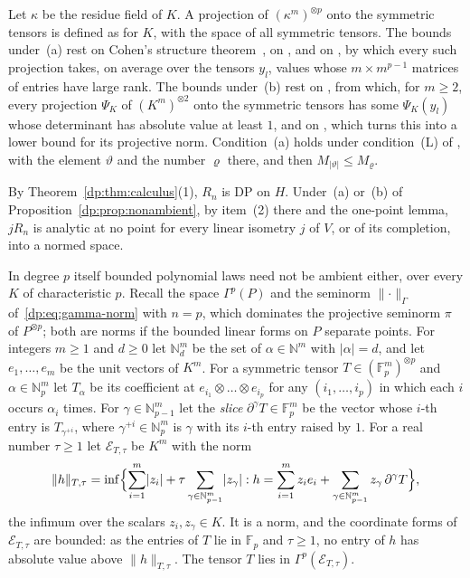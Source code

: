 \documentclass[11pt]{amsart}
\theoremstyle{definition}
\theoremstyle{remark}
\numberwithin{equation}{section}
\newcommand{\N}{\mathbb N}
\newcommand{\F}{\mathbb F}
\newcommand{\abs}[1]{\lvert #1\rvert}
\newcommand{\norm}[1]{\lVert #1\rVert}
\theoremstyle{plain}
\theoremstyle{definition}
\theoremstyle{plain}
\begin{document}
Let $\kappa$ be the residue field of $K$. A projection of $(\kappa^m)^{\otimes p}$ onto the symmetric tensors is defined as for $K$, with the space of all symmetric tensors. The bounds under~(a) rest on Cohen's structure theorem~\cite{Co}, on \cite[Lemma~K.2(2)]{I}, and on \cite[Lemma~Q.6(4)]{I}, by which every such projection takes, on average over the tensors $y_l$, values whose $m\times m^{p-1}$ matrices of entries have large rank. The bounds under~(b) rest on \cite[Proposition~N.12]{I}, from which, for $m\ge2$, every projection $\Psi_K$ of $(K^m)^{\otimes2}$ onto the symmetric tensors has some $\Psi_K(y_l)$ whose determinant has absolute value at least $1$, and on \cite[Lemma~N.15(2)]{I}, which turns this into a lower bound for its projective norm. Condition~(a) holds under condition~\textup{(L)} of \cite[Section~7.1]{I}, with the element $\vartheta$ and the number $\varrho$ there, and then $M_{\abs\vartheta}\le M_\varrho$.

By Theorem~\ref{dp:thm:calculus}(1), $R_n$ is DP on $H$. Under~(a) or~(b) of Proposition~\ref{dp:prop:nonambient}, by item~(2) there and the one-point lemma, $jR_n$ is analytic at no point for every linear isometry $j$ of $V$, or of its completion, into a normed space.

In degree $p$ itself bounded polynomial laws need not be ambient either, over every $K$ of characteristic $p$. Recall the space $\Gamma^p(P)$ and the seminorm $\norm\cdot_\Gamma$ of~\eqref{dp:eq:gamma-norm} with $n=p$, which dominates the projective seminorm $\pi$ of $P^{\otimes p}$; both are norms if the bounded linear forms on $P$ separate points. For integers $m\ge1$ and $d\ge0$ let $\N^m_d$ be the set of $\alpha\in\N^m$ with $\abs\alpha=d$, and let $e_1,\dots,e_m$ be the unit vectors of $K^m$. For a symmetric tensor $T\in(\F_p^m)^{\otimes p}$ and $\alpha\in\N^m_p$ let $T_\alpha$ be its coefficient at $e_{i_1}\otimes\dots\otimes e_{i_p}$ for any $(i_1,\dots,i_p)$ in which each $i$ occurs $\alpha_i$ times. For $\gamma\in\N^m_{p-1}$ let the \emph{slice} $\partial^\gamma T\in\F_p^m$ be the vector whose $i$-th entry is $T_{\gamma^{+i}}$, where $\gamma^{+i}\in\N^m_p$ is $\gamma$ with its $i$-th entry raised by $1$. For a real number $\tau\ge1$ let $\mathcal E_{T,\tau}$ be $K^m$ with the norm
\begin{equation}\label{dp:eq:weighted-norm}
 \norm h_{T,\tau}=\inf\Bigl\{\sum_{i=1}^m\abs{z_i}+\tau\sum_{\gamma\in\N^m_{p-1}}\abs{z_\gamma}:
 h=\sum_{i=1}^mz_ie_i+\sum_{\gamma\in\N^m_{p-1}}z_\gamma\,\partial^\gamma T\Bigr\},
\end{equation}
the infimum over the scalars $z_i,z_\gamma\in K$. It is a norm, and the coordinate forms of $\mathcal E_{T,\tau}$ are bounded: as the entries of $T$ lie in $\F_p$ and $\tau\ge1$, no entry of $h$ has absolute value above $\norm h_{T,\tau}$. The tensor $T$ lies in $\Gamma^p(\mathcal E_{T,\tau})$.
\end{document}
